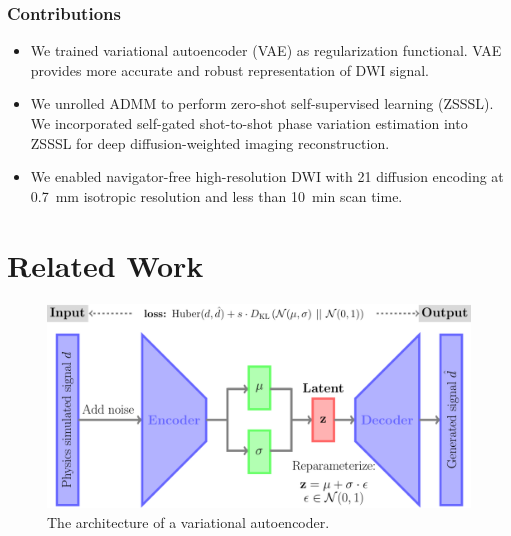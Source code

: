 \documentclass[journal,twoside,web]{ieeecolor}
\begin{document}
	\subsubsection*{Contributions}
	\begin{itemize}
		\item We trained variational autoencoder (VAE) as regularization functional. VAE provides more accurate and robust representation of DWI signal.
		\item We unrolled ADMM to perform zero-shot self-supervised learning (ZSSSL). We incorporated self-gated shot-to-shot phase variation estimation into ZSSSL for deep diffusion-weighted imaging reconstruction.
		\item We enabled navigator-free high-resolution DWI with 21 diffusion encoding
		at \SI{0.7}{\milli\meter} isotropic resolution and less than \SI{10}{\minute} scan time.
	\end{itemize}


	\section{Related Work}

	\begin{figure}
		\centering
		\includegraphics[width=\columnwidth]{../figures/fig1.png}
		\caption{The architecture of a variational autoencoder.
		}
		\label{FIG:MODEL_VAE}
	\end{figure}
\end{document}
